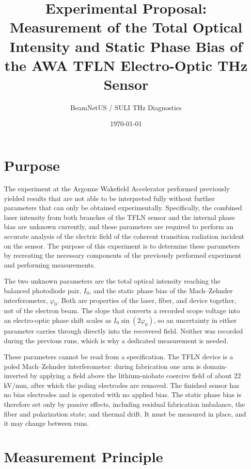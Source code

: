 \documentclass[11pt]{article}
\title{\vspace{-1.5em}Experimental Proposal: Measurement of the Total Optical
Intensity and Static Phase Bias of the AWA TFLN Electro-Optic THz Sensor}
\author{BeamNetUS / SULI THz Diagnostics}
\date{\today}
\newcommand{\Iz}{I_{0}}
\newcommand{\phz}{\varphi_{0}}
\begin{document}
\maketitle
\vspace{-1em}

\section{Purpose}

The experiment at the Argonne Wakefield Accelerator performed previously yielded
results that are not able to be interpreted fully without further parameters that can
only be obtained experimentally. Specifically, the combined laser intensity from both
branches of the TFLN sensor and the internal phase bias are unknown currently, and
these parameters are required to perform an accurate analysis of the electric field of
the coherent transition radiation incident on the sensor. The purpose of this
experiment is to determine these parameters by recreating the necessary components of
the previously performed experiment and performing measurements.

The two unknown parameters are the total optical intensity reaching the balanced
photodiode pair, $\Iz$, and the static phase bias of the Mach--Zehnder interferometer,
$\phz$. Both are properties of the laser, fiber, and device together, not of the
electron beam. The slope that converts a recorded scope voltage into an electro-optic
phase shift scales as $\Iz \sin(2\phz)$, so an uncertainty in either parameter carries
through directly into the recovered field. Neither was recorded during the previous
runs, which is why a dedicated measurement is needed.

These parameters cannot be read from a specification. The TFLN device is a poled
Mach--Zehnder interferometer: during fabrication one arm is domain-inverted by applying
a field above the lithium-niobate coercive field of about 22 kV/mm, after which the
poling electrodes are removed. The finished sensor has no bias electrodes and is
operated with no applied bias. The static phase bias is therefore set only by passive
effects, including residual fabrication imbalance, the fiber and polarization state, and
thermal drift. It must be measured in place, and it may change between runs.

\section{Measurement Principle}
\end{document}

